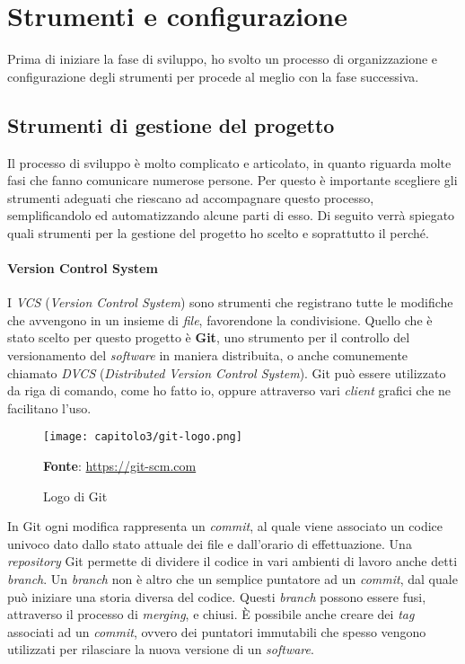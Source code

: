 
\section{Strumenti e configurazione}
Prima di iniziare la fase di sviluppo, ho svolto un processo di organizzazione e configurazione degli strumenti per procede al meglio con la fase successiva. 

\subsection{Strumenti di gestione del progetto}
Il processo di sviluppo è molto complicato e articolato, in quanto riguarda molte fasi che fanno comunicare numerose persone. Per questo è importante scegliere gli strumenti adeguati che riescano ad accompagnare questo processo, semplificandolo ed automatizzando alcune parti di esso. Di seguito verrà spiegato quali strumenti per la gestione del progetto ho scelto e soprattutto il perché.

\paragraph{Version Control System}
I \textit{VCS} (\textit{Version Control System}) sono strumenti che registrano tutte le modifiche che avvengono in un insieme di \textit{file}, favorendone la condivisione. Quello che è stato scelto per questo progetto è \textbf{Git}, uno strumento per il controllo del versionamento del \textit{software} in maniera distribuita, o anche comunemente chiamato \textit{DVCS} (\textit{Distributed Version Control System}). Git può essere utilizzato da riga di comando, come ho fatto io, oppure attraverso vari \textit{client} grafici che ne facilitano l'uso.

\begin{figure}[h!]
  \centering
  \texttt{[image: capitolo3/git-logo.png]}
  \caption{Logo di Git}
  \textbf{Fonte}: \href{https://git-scm.com}{https://git-scm.com}
\end{figure}

In Git ogni modifica rappresenta un \textit{commit}, al quale viene associato un codice univoco dato dallo stato attuale dei file e dall'orario di effettuazione. Una \textit{repository} Git permette di dividere il codice in vari ambienti di lavoro anche detti \textit{branch}. Un \textit{branch} non è altro che un semplice puntatore ad un \textit{commit}, dal quale può iniziare una storia diversa del codice. Questi \textit{branch} possono essere fusi, attraverso il processo di \textit{merging}, e chiusi. È possibile anche creare dei \textit{tag} associati ad un \textit{commit}, ovvero dei puntatori immutabili che spesso vengono utilizzati per rilasciare la nuova versione di un \textit{software}. \\

